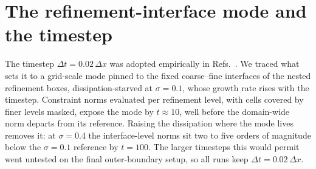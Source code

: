 \documentclass[twocolumn,floatfix,aps,prd,superscriptaddress,nofootinbib]{revtex4-2}
\begin{document}
\section{The refinement-interface mode and the timestep}
\label{app:interface}

The timestep $\Delta t=0.02\,\Delta x$ was adopted empirically in Refs.~\cite{shirokov2026,shirokov2026c}. We traced what sets it to a grid-scale mode pinned to the fixed coarse--fine interfaces of the nested refinement boxes, dissipation-starved at $\sigma=0.1$, whose growth rate rises with the timestep. Constraint norms evaluated per refinement level, with cells covered by finer levels masked, expose the mode by $t\approx10$, well before the domain-wide norm departs from its reference. Raising the dissipation where the mode lives removes it: at $\sigma=0.4$ the interface-level norms sit two to five orders of magnitude below the $\sigma=0.1$ reference by $t=100$. The larger timesteps this would permit went untested on the final outer-boundary setup, so all runs keep $\Delta t=0.02\,\Delta x$.

\FloatBarrier
\end{document}
